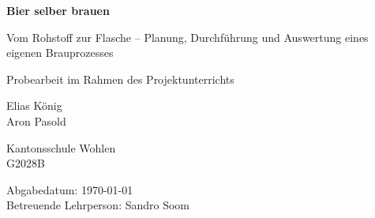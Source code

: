 
\begin{titlepage}
\centering

\vspace*{2cm}

{\LARGE\bfseries Bier selber brauen\par}
\vspace{0.5em}
{\Large Vom Rohstoff zur Flasche -- Planung, Durchführung und
  Auswertung eines eigenen Brauprozesses\par}

\vspace{3cm}

{\large Probearbeit im Rahmen des Projektunterrichts\par}

\vspace{3cm}

{\large
  Elias König \\
  Aron Pasold \\
}

\vspace{2cm}

{\large
  Kantonsschule Wohlen \\
  G2028B \\
}

\vspace{2cm}

{\large
  Abgabedatum: \today \\
  Betreuende Lehrperson: Sandro Soom \\
}

\vfill

\end{titlepage}
